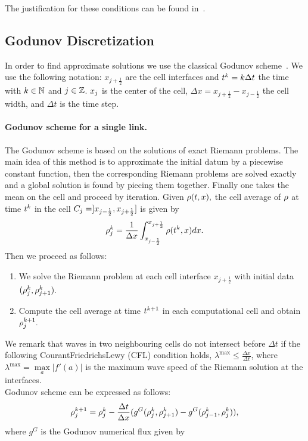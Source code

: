 The justification for these conditions can be found in~\cite{garavello2006traffic}.


\subsection{Godunov Discretization\label{sub:Godunov-Discretization}}

In order to find approximate solutions we use the classical Godunov scheme~\cite{godunov1959}. We use the following notation: $x_{j+\frac{1}{2}}$ are the cell interfaces and   $t^{k}=k\Delta t$ the time with $k\in\mathbb{N}$ and $j\in\mathbb{Z}$. $x_{j}$ is the center of the cell, $\Delta x=x_{j+\frac{1}{2}}-x_{j-\frac{1}{2}}$ the cell width, and $\Delta t$ is the time step. 
\paragraph{Godunov scheme for a single link.}

The Godunov scheme is based on the solutions of exact Riemann problems. The main idea of this method is to approximate the initial datum by a piecewise constant function, then the corresponding Riemann problems are solved exactly and a global solution is found by piecing them together. Finally one takes the mean on the cell and proceed by iteration. Given $\rho(t,x),$ the cell average of $\rho$ at time $t^{k}$ in the cell $C_{j}=]x_{j-\frac{1}{2}},x_{j+\frac{1}{2}}]$ is given by 
\begin{equation}
\rho_{j}^{k}=\dfrac{1}{\Delta x}\int_{x_{j-\frac{1}{2}}}^{x_{j+\frac{1}{2}}}\rho(t^{k},x)dx.\label{eq:godproj}
\end{equation}
Then we proceed as follows:
\begin{enumerate}
	\item We solve the Riemann problem at each cell interface $x_{j+\frac{1}{2}}$ with initial data $(\rho^{k}_{j},\rho^{k}_{j+1}).$
	\item Compute the cell average at time $t^{k +1}$ in each computational cell and obtain $\rho^{k +1}_{j}.$ 
\end{enumerate}

We remark that waves in two neighbouring cells do not intersect before $\Delta t$ if the following Courant\textendash{}Friedrichs\textendash{}Lewy (CFL) condition holds, $\lambda^{\max}\le\frac{\Delta x}{\Delta t}$, where $\lambda^{\max}=\underset{a}{\max}|f'\left(a\right)|$ is the maximum wave speed of the Riemann solution at the interfaces.\\
Godunov scheme can be expressed as follows:
\begin{equation}
\rho_{j}^{k+1}=\rho_{j}^{k}-\frac{\Delta t}{\Delta x}(g^{G}(\rho_{j}^{k},\rho_{j+1}^{k})-g^{G}(\rho_{j-1}^{k},\rho_{j}^{k})),\label{eq:godscheme}
\end{equation}
where $g^{G}$ is the Godunov numerical flux given by

